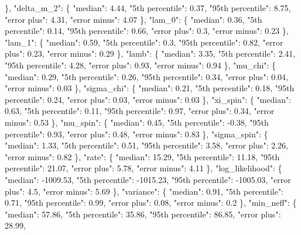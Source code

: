 {{        \}, %
        "delta\_m\_2": \{%
          "median": 4.44, %
          "5th percentile": 0.37, %
          "95th percentile": 8.75, %
          "error plus": 4.31, %
          "error minus": 4.07%
        \}, %
        "lam\_0": \{%
          "median": 0.36, %
          "5th percentile": 0.14, %
          "95th percentile": 0.66, %
          "error plus": 0.3, %
          "error minus": 0.23%
        \}, %
        "lam\_1": \{%
          "median": 0.59, %
          "5th percentile": 0.3, %
          "95th percentile": 0.82, %
          "error plus": 0.23, %
          "error minus": 0.29%
        \}, %
        "lamb": \{%
          "median": 3.35, %
          "5th percentile": 2.41, %
          "95th percentile": 4.28, %
          "error plus": 0.93, %
          "error minus": 0.94%
        \}, %
        "mu\_chi": \{%
          "median": 0.29, %
          "5th percentile": 0.26, %
          "95th percentile": 0.34, %
          "error plus": 0.04, %
          "error minus": 0.03%
        \}, %
        "sigma\_chi": \{%
          "median": 0.21, %
          "5th percentile": 0.18, %
          "95th percentile": 0.24, %
          "error plus": 0.03, %
          "error minus": 0.03%
        \}, %
        "xi\_spin": \{%
          "median": 0.63, %
          "5th percentile": 0.11, %
          "95th percentile": 0.97, %
          "error plus": 0.34, %
          "error minus": 0.53%
        \}, %
        "mu\_spin": \{%
          "median": 0.45, %
          "5th percentile": {-}0.38, %
          "95th percentile": 0.93, %
          "error plus": 0.48, %
          "error minus": 0.83%
        \}, %
        "sigma\_spin": \{%
          "median": 1.33, %
          "5th percentile": 0.51, %
          "95th percentile": 3.58, %
          "error plus": 2.26, %
          "error minus": 0.82%
        \}, %
        "rate": \{%
          "median": 15.29, %
          "5th percentile": 11.18, %
          "95th percentile": 21.07, %
          "error plus": 5.78, %
          "error minus": 4.11%
        \}, %
        "log\_likelihood": \{%
          "median": {-}1009.53, %
          "5th percentile": {-}1015.23, %
          "95th percentile": {-}1005.03, %
          "error plus": 4.5, %
          "error minus": 5.69%
        \}, %
        "variance": \{%
          "median": 0.91, %
          "5th percentile": 0.71, %
          "95th percentile": 0.99, %
          "error plus": 0.08, %
          "error minus": 0.2%
        \}, %
        "min\_neff": \{%
          "median": 57.86, %
          "5th percentile": 35.86, %
          "95th percentile": 86.85, %
          "error plus": 28.99, %
}}
